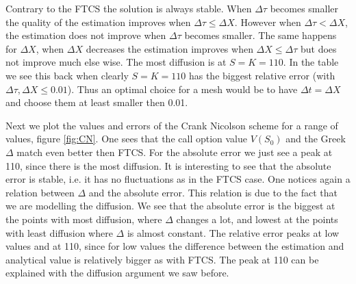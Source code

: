 \documentclass[11pt,a4paper]{article}
\begin{document}
Contrary to the FTCS the solution is always stable. When $\Delta \tau$ becomes smaller the quality of the estimation improves when $\Delta \tau \leq \Delta X$. However when $\Delta \tau < \Delta X$, the estimation does not improve when $\Delta \tau$ becomes smaller. The same happens for $\Delta X$, when $\Delta X$ decreases the estimation improves when $\Delta X \leq \Delta \tau$ but does not improve much else wise. The most diffusion is at $S=K=110$. In the table we see this back when clearly $S=K=110$ has the biggest relative error (with $\Delta \tau, \Delta X \leq 0.01$). Thus an optimal choice for a mesh would be to have $\Delta t=\Delta X$ and choose them at least smaller then 0.01.

Next we plot the values and errors of the Crank Nicolson scheme for a range of values, figure \ref{fig:CN}. One sees that the call option value $V(S_0)$ and the Greek $\Delta$ match even better then FTCS. For the absolute error we just see a peak at 110, since there is the most diffusion. It is interesting to see that the absolute error is stable, i.e. it has no fluctuations as in the FTCS case. One notices again a relation between $\Delta$ and the absolute error. This relation is due to the fact that we are modelling the diffusion. We see that the absolute error is the biggest at the points with most diffusion, where $\Delta$ changes a lot, and lowest at the points with least diffusion where $\Delta$ is almost constant. The relative error peaks at low values and at 110, since for low values the difference between the estimation and analytical value is relatively bigger as with FTCS. The peak at 110 can be explained with the diffusion argument we saw before.
\end{document}
